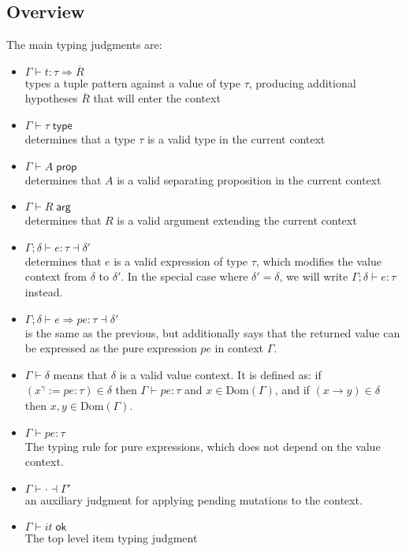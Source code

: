 \documentclass[acmsmall,nonacm]{acmart}
\newcommand{\proves}{\vdash}
\newcommand{\makes}{\dashv}
\newcommand{\constep}{\proves\cdot\makes}
\begin{document}
\subsection{Overview}

The main typing judgments are:

\begin{itemize}
  \item $\Gamma \proves t:\tau \Rightarrow \overline{R}$\\ types a tuple pattern against a value of type $\tau$, producing additional hypotheses $\overline{R}$ that will enter the context
  \item $\Gamma \proves \tau\;\mathsf{type}$\\ determines that a type $\tau$ is a valid type in the current context
  \item $\Gamma \proves A\;\mathsf{prop}$\\ determines that $A$ is a valid separating proposition in the current context
  \item $\Gamma \proves R\;\mathsf{arg}$\\ determines that $R$ is a valid argument extending the current context
  \item $\Gamma;\delta \proves e:\tau \makes\delta'$\\ determines that $e$ is a valid expression of type $\tau$, which modifies the value context from $\delta$ to $\delta'$. In the special case where $\delta'=\delta$, we will write $\Gamma;\delta \proves e:\tau$ instead.
  \item $\Gamma;\delta \proves e\Rightarrow pe:\tau \makes\delta'$\\ is the same as the previous, but additionally says that the returned value can be expressed as the pure expression $pe$ in context $\Gamma$.
  \item $\Gamma\proves \delta$ means that $\delta$ is a valid value context.
  It is defined as: if $(x^\gamma:=pe:\tau)\in\delta$ then $\Gamma\proves pe:\tau$ and $x\in\mathrm{Dom}(\Gamma)$, and if $(x\to y)\in\delta$ then $x,y\in\mathrm{Dom}(\Gamma)$.
  \item $\Gamma \proves pe:\tau$\\ The typing rule for pure expressions, which does not depend on the value context.
  \item $\Gamma \constep \Gamma'$\\ an auxiliary judgment for applying pending mutations to the context.
  \item $\Gamma\proves it\;\mathsf{ok}$\\ The top level item typing judgment
\end{itemize}
\end{document}
